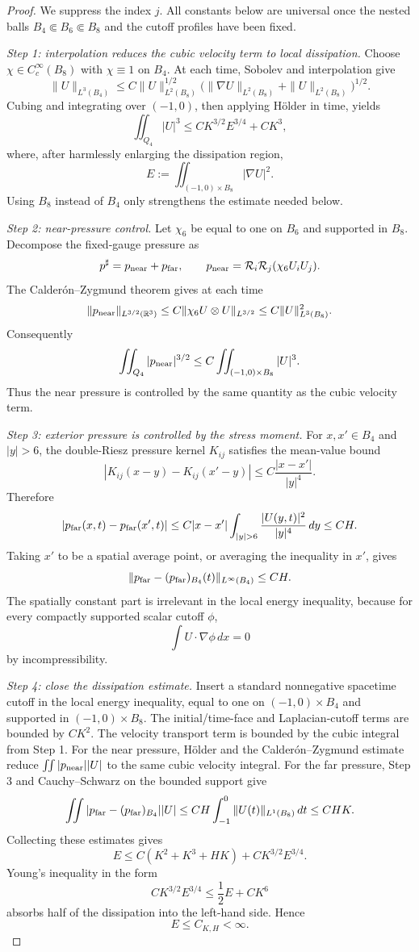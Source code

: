 \documentclass[11pt]{article}
\theoremstyle{definition}\newtheorem{problem}[theorem]{Problem}
\theoremstyle{definition}
\theoremstyle{remark}
\newcommand{\R}{\mathbb R}
\begin{document}
\begin{proof}
We suppress the index \(j\).  All constants below are universal once the
nested balls \(B_4\Subset B_6\Subset B_8\) and the cutoff profiles have been
fixed.

\emph{Step 1: interpolation reduces the cubic velocity term to local
dissipation.}
Choose \(\chi\in C_c^\infty(B_8)\) with \(\chi\equiv1\) on \(B_4\).  At each
time, Sobolev and interpolation give
\[
 \|U\|_{L^3(B_4)}
 \le C\|U\|_{L^2(B_8)}^{1/2}
 \bigl(\|\nabla U\|_{L^2(B_8)}+\|U\|_{L^2(B_8)}\bigr)^{1/2}.
\]
Cubing and integrating over \((-1,0)\), then applying H\"older in time, yields
\[
 \iint_{Q_4}|U|^3
 \le C K^{3/2}E^{3/4}+CK^3,
\]
where, after harmlessly enlarging the dissipation region,
\[
 E:=\iint_{(-1,0)\times B_8}|\nabla U|^2.
\]
Using \(B_8\) instead of \(B_4\) only strengthens the estimate needed below.

\emph{Step 2: near-pressure control.}
Let \(\chi_6\) be equal to one on \(B_6\) and supported in \(B_8\).  Decompose
the fixed-gauge pressure as
\[
 p^\sharp=p_{\rm near}+p_{\rm far},
 \qquad
 p_{\rm near}=\mathcal R_i\mathcal R_j(\chi_6U_iU_j).
\]
The Calder\'on--Zygmund theorem gives at each time
\[
 \|p_{\rm near}\|_{L^{3/2}(\R^3)}
 \le C\|\chi_6U\otimes U\|_{L^{3/2}}
 \le C\|U\|_{L^3(B_8)}^2.
\]
Consequently
\[
 \iint_{Q_4}|p_{\rm near}|^{3/2}
 \le C\iint_{(-1,0)\times B_8}|U|^3.
\]
Thus the near pressure is controlled by the same quantity as the cubic
velocity term.

\emph{Step 3: exterior pressure is controlled by the stress moment.}
For \(x,x'\in B_4\) and \(|y|>6\), the double-Riesz pressure kernel
\(K_{ij}\) satisfies the mean-value bound
\[
 |K_{ij}(x-y)-K_{ij}(x'-y)|
 \le C\frac{|x-x'|}{|y|^4}.
\]
Therefore
\[
 |p_{\rm far}(x,t)-p_{\rm far}(x',t)|
 \le C|x-x'|
 \int_{|y|>6}\frac{|U(y,t)|^2}{|y|^4}\,dy
 \le CH.
\]
Taking \(x'\) to be a spatial average point, or averaging the inequality in
\(x'\), gives
\[
 \|p_{\rm far}-(p_{\rm far})_{B_4}(t)\|_{L^\infty(B_4)}
 \le CH.
\]
The spatially constant part is irrelevant in the local energy inequality,
because for every compactly supported scalar cutoff \(\phi\),
\[
 \int U\cdot\nabla\phi\,dx=0
\]
by incompressibility.

\emph{Step 4: close the dissipation estimate.}
Insert a standard nonnegative spacetime cutoff in the local energy inequality,
equal to one on \((-1,0)\times B_4\) and supported in
\((-1,0)\times B_8\).  The initial/time-face and Laplacian-cutoff terms are
bounded by \(CK^2\).  The velocity transport term is bounded by the cubic
integral from Step 1.  For the near pressure, H\"older and the
Calder\'on--Zygmund estimate reduce
\(\iint |p_{\rm near}||U|\) to the same cubic velocity integral.  For the far
pressure, Step 3 and Cauchy--Schwarz on the bounded support give
\[
 \iint |p_{\rm far}-(p_{\rm far})_{B_4}||U|
 \le CH\int_{-1}^0\|U(t)\|_{L^1(B_8)}\,dt
 \le CHK.
\]
Collecting these estimates gives
\[
 E
 \le C(K^2+K^3+HK)+CK^{3/2}E^{3/4}.
\]
Young's inequality in the form
\[
 CK^{3/2}E^{3/4}
 \le \frac12E+C K^6
\]
absorbs half of the dissipation into the left-hand side.  Hence
\[
 E\le C_{K,H}<\infty.
\]


\end{proof}
\end{document}
